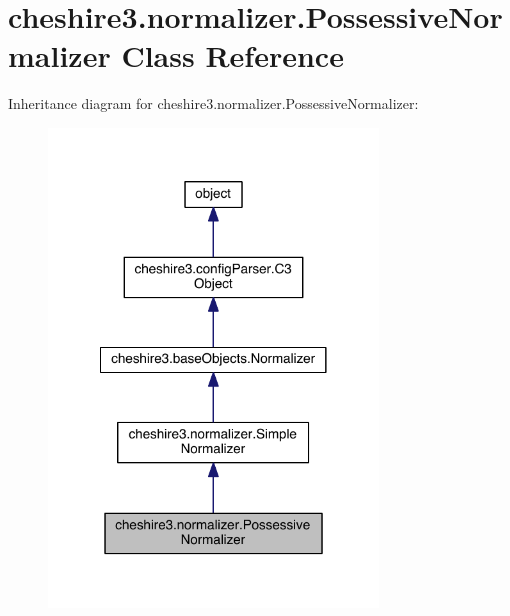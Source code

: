 \hypertarget{classcheshire3_1_1normalizer_1_1_possessive_normalizer}{\section{cheshire3.\-normalizer.\-Possessive\-Normalizer Class Reference}
\label{classcheshire3_1_1normalizer_1_1_possessive_normalizer}
}


Inheritance diagram for cheshire3.\-normalizer.\-Possessive\-Normalizer\-:
\nopagebreak
\begin{figure}[H]
\begin{center}
\leavevmode
\includegraphics[width=248pt]{classcheshire3_1_1normalizer_1_1_possessive_normalizer__inherit__graph}
\end{center}
\end{figure}


